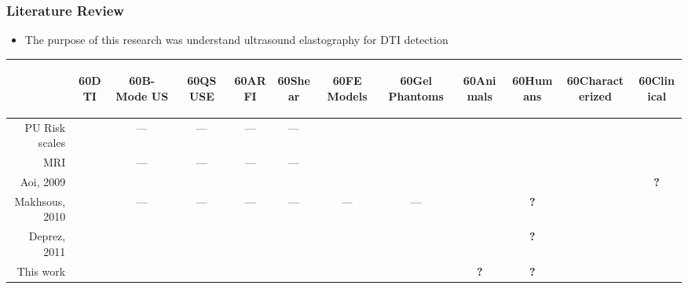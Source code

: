 \documentclass{beamer}
\newcommand{\rotHead}[1]{\begin{rotate}{60}#1\end{rotate}}
\newcommand{\cmark}{\color{ExecusharesBlue}\ding{51}}
\newcommand{\xmark}{\color{ExecusharesRed}\ding{55}}
\begin{document}
		\begin{frame}
			\frametitle{Literature Review}
			\begin{itemize}
				\item The \alert{purpose} of this research was understand ultrasound elastography for DTI detection
			\end{itemize}
			\begin{center}
				\vspace{1cm}
				\begin{tabular}{r|c|cccc|cccc|cc}
					& \rotHead{DTI} & \rotHead{B-Mode US} & \rotHead{QS USE} & \rotHead{ARFI} & \rotHead{Shear} & \rotHead{FE Models} & \rotHead{Gel Phantoms} & \rotHead{Animals} & \rotHead{Humans} & \rotHead{Characterized} & \rotHead{Clinical} \\
					\hline
					PU Risk scales & \xmark & --- & --- & --- & --- & \xmark & \xmark & \xmark & \cmark & \cmark & \cmark \\
					MRI & \cmark & --- & --- & --- & --- & \cmark & \cmark & \cmark& \cmark & \xmark & \xmark \\
					\hline
					Aoi, 2009 & \cmark & \cmark & \xmark & \xmark & \xmark & \xmark & \xmark & \xmark & \cmark & \xmark & \color{ExecusharesBlue}\textbf{?} \\
					Makhsous, 2010 & \cmark & --- & --- & --- & --- & --- & --- & \cmark & \color{ExecusharesBlue}\textbf{?} & \xmark & \cmark \\
					Deprez, 2011 & \cmark & \xmark & \cmark & \xmark & \xmark & \cmark & \cmark & \cmark & \color{ExecusharesBlue}\textbf{?} & \xmark & \cmark \\
					\hline
					{\color{ExecusharesRed}\ding{220}} This work & \cmark & \xmark & \cmark & \cmark & \cmark & \cmark & \cmark & \color{ExecusharesBlue}\textbf{?} & \color{ExecusharesBlue}\textbf{?} & \cmark & \cmark \\
				\end{tabular}
			\end{center}
		\end{frame}

\end{document}
